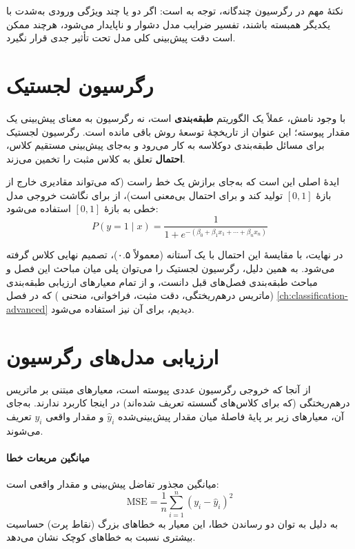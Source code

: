 نکتهٔ مهم در رگرسیون چندگانه، توجه به
 است: اگر دو یا چند
ویژگی ورودی به‌شدت با یکدیگر همبسته باشند، تفسیر ضرایب مدل دشوار و
ناپایدار می‌شود، هرچند ممکن است دقت پیش‌بینی کلی مدل تحت تأثیر جدی قرار
نگیرد.

\section{رگرسیون لجستیک}

با وجود نامش، 
عملاً یک الگوریتم \textbf{طبقه‌بندی} است، نه رگرسیون به معنای پیش‌بینی
یک مقدار پیوسته؛ این عنوان از تاریخچهٔ توسعهٔ روش باقی مانده است. رگرسیون
لجستیک برای مسائل طبقه‌بندی دوکلاسه به کار می‌رود و به‌جای پیش‌بینی
مستقیم کلاس، \textbf{احتمال} تعلق به کلاس مثبت را تخمین می‌زند.

ایدهٔ اصلی این است که به‌جای برازش یک خط راست (که می‌تواند مقادیری خارج
از بازهٔ $[0, 1]$ تولید کند و برای احتمال بی‌معنی است)، از
 برای نگاشت خروجی مدل
خطی به بازهٔ $[0, 1]$ استفاده می‌شود:
\[
P(y=1 \mid x) = \frac{1}{1 + e^{-(\beta_0 + \beta_1 x_1 + \cdots + \beta_n x_n)}}
\]

در نهایت، با مقایسهٔ این احتمال با یک آستانه (معمولاً ۰.۵)، تصمیم نهایی
کلاس گرفته می‌شود. به همین دلیل، رگرسیون لجستیک را می‌توان پلی میان
مباحث این فصل و مباحث طبقه‌بندی فصل‌های قبل دانست، و از تمام معیارهای
ارزیابی طبقه‌بندی (ماتریس درهم‌ریختگی، دقت مثبت، فراخوانی، منحنی
) که در فصل \ref{ch:classification-advanced} دیدیم، برای آن نیز
استفاده می‌شود.

\section{ارزیابی مدل‌های رگرسیون}

از آنجا که خروجی رگرسیون عددی پیوسته است، معیارهای مبتنی بر ماتریس
درهم‌ریختگی (که برای کلاس‌های گسسته تعریف شده‌اند) در اینجا کاربرد
ندارند. به‌جای آن، معیارهای زیر بر پایهٔ فاصلهٔ میان مقدار پیش‌بینی‌شده
$\hat{y}_i$ و مقدار واقعی $y_i$ تعریف می‌شوند.

\paragraph{میانگین مربعات خطا}
 میانگین
مجذور تفاضل پیش‌بینی و مقدار واقعی است:
\[
\text{MSE} = \frac{1}{n} \sum_{i=1}^{n} (y_i - \hat{y}_i)^2
\]
به دلیل به توان دو رساندن خطا، این معیار به خطاهای بزرگ (نقاط پرت) حساسیت
بیشتری نسبت به خطاهای کوچک نشان می‌دهد.

